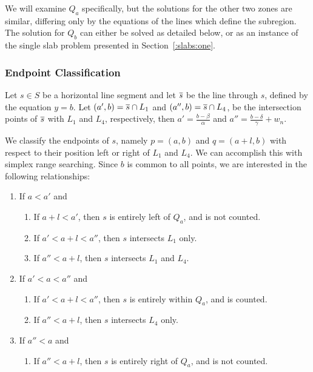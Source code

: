 We will examine $Q_a$ specifically, but the solutions for the other two zones are similar, differing only by the equations of the lines which define the subregion. 
The solution for $Q_b$ can either be solved as detailed below, or as an instance of the single slab problem presented in Section~\ref{:slabs:one}.


\subsubsection{Endpoint Classification}

Let $s \in S$ be a horizontal line segment and let $\overline{s}$ be the line through $s$, defined by the equation $y = b$.
Let $(a', b) = \overline{s} \cap L_1$ and $(a'', b) = \overline{s} \cap L_4$, be the intersection points of $\overline{s}$ with $L_1$ and $L_4$, respectively, then $a' = \frac{b - \beta}{\alpha}$ and $a'' = \frac{b - \delta}{\gamma} + w_n$.

We classify the endpoints of $s$, namely $p = (a, b)$ and $q = (a + l, b)$ with respect to their position left or right of $L_1$ and $L_4$. We can accomplish this with simplex range searching. Since $b$ is common to all points, we are interested in the following relationships:

\begin{enumerate}
 \item If $a < a'$ and

 \begin{enumerate}
  \item If $a + l < a'$, then $s$ is entirely left of $Q_a$, and is not counted.
  \item If $a' < a + l < a''$, then $s$ intersects $L_1$ only.
  \item If $a'' < a + l$, then $s$ intersects $L_1$ and $L_4$.
 \end{enumerate}

 \item If $a' < a < a''$ and
 \begin{enumerate}
  \item If $a' < a + l < a''$, then $s$ is entirely within $Q_a$, and is counted.
  \item If $a'' < a + l$, then $s$ intersects $L_4$ only.
 \end{enumerate}

 \item If $a'' < a$ and
 \begin{enumerate}
  \item If $a'' < a + l$, then $s$ is entirely right of $Q_a$, and is not counted.
 \end{enumerate}
\end{enumerate}

